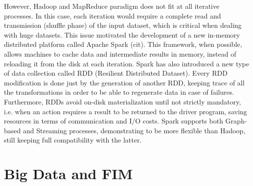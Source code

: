 However, Hadoop and MapReduce paradigm does not fit at all iterative processes. In this case, each iteration would require a complete read and transmission (shuffle phase) of the input dataset, which is critical when dealing with huge datasets. This issue motivated the development of a new in-memory distributed platform called Apache Spark (cit). This framework, when possible, allows machines to cache data and intermediate results in memory, instead of reloading it from the disk at each iteration. Spark has also introduced a new type of data collection called RDD (Resilient Distributed Dataset). Every RDD modification is done just by the generation of another RDD, keeping trace of all the transformations in order to be able to regenerate data in case of failures. Furthermore, RDDs avoid on-disk materialization until not strictly mandatory, i.e. when an action requires a result to be returned to the driver program, saving resources in terms of communication and I/O costs. Spark supports both Graph-based and Streaming processes, demonstrating to be more flexible than Hadoop, still keeping full compatibility with the latter.

\section{Big Data and FIM}




